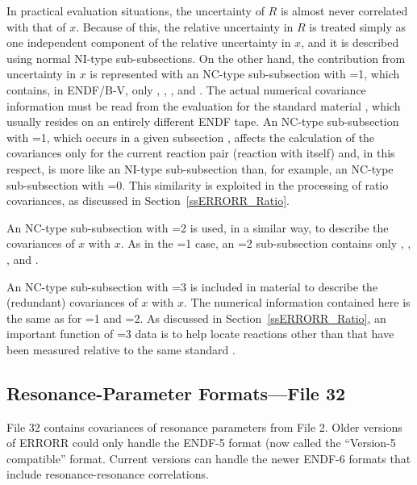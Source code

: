 In practical evaluation situations, the uncertainty of $R$ is almost
never correlated with that of $x$.  Because of this,
the relative uncertainty in $R$ is treated simply as one independent
component of the relative uncertainty in $x$, and it is
described using normal NI-type sub-subsections.  On the other hand, the
contribution from uncertainty in $x$ is represented
with an NC-type sub-subsection with =1, which contains,
in ENDF/B-V, only , , , and .
The actual numerical covariance information must be read from the
evaluation for the standard material , which usually resides
on an entirely different ENDF tape.  An NC-type sub-subsection with
=1, which occurs in a given subsection
, affects the calculation of the covariances
only for the current reaction pair (reaction  with itself)
and, in this respect, is more like an NI-type sub-subsection than, for
example, an NC-type sub-subsection with =0.  This similarity
is exploited in the processing of ratio covariances, as discussed in
Section~\ref{ssERRORR_Ratio}.

An NC-type sub-subsection with =2 is used, in a similar way,
to describe the covariances of $x$ with
$x$.  As in the =1 case, an =2
sub-subsection contains only , , , and
.

An NC-type sub-subsection with =3 is included in material
 to describe the (redundant) covariances of
$x$ with $x$.  The numerical
information contained here is the same as for =1 and
=2.  As discussed in Section~\ref{ssERRORR_Ratio},
an important function of
=3 data is to help locate reactions other than
 that have been measured relative to the same standard
.


\subsection{Resonance-Parameter Formats---File 32}
\label{ssERRORR_RR32}

File 32 contains covariances of resonance parameters
 from File 2.  Older versions of ERRORR
could only handle the ENDF-5 format (now called the
``Version-5 compatible'' format.  Current versions can handle the
newer ENDF-6 formats that include resonance-resonance correlations.

